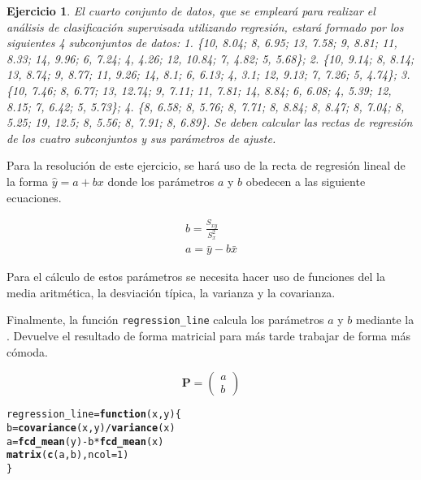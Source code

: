 \documentclass[12pt]{report}\usepackage[]{graphicx}\usepackage[dvipsnames]{xcolor}
\makeatletter
\newcommand{\hlnum}[1]{\textcolor[rgb]{0.686,0.059,0.569}{#1}}%
\newcommand{\hlopt}[1]{\textcolor[rgb]{0,0,0}{#1}}%
\newcommand{\hlstd}[1]{\textcolor[rgb]{0.345,0.345,0.345}{#1}}%
\newcommand{\hlkwa}[1]{\textcolor[rgb]{0.161,0.373,0.58}{\textbf{#1}}}%
\newcommand{\hlkwb}[1]{\textcolor[rgb]{0.69,0.353,0.396}{#1}}%
\newcommand{\hlkwc}[1]{\textcolor[rgb]{0.333,0.667,0.333}{#1}}%
\newcommand{\hlkwd}[1]{\textcolor[rgb]{0.737,0.353,0.396}{\textbf{#1}}}%
\newenvironment{kframe}{%
 \def\at@end@of@kframe{}%
 \ifinner\ifhmode%
  \def\at@end@of@kframe{\end{minipage}}%
  \begin{minipage}{\columnwidth}%
 \fi\fi%
 \def\FrameCommand##1{\hskip\@totalleftmargin \hskip-\fboxsep
 \colorbox{shadecolor}{##1}\hskip-\fboxsep
     \hskip-\linewidth \hskip-\@totalleftmargin \hskip\columnwidth}%
 \MakeFramed {\advance\hsize-\width
   \@totalleftmargin\z@ \linewidth\hsize
   \@setminipage}}%
 {\par\unskip\endMakeFramed%
 \at@end@of@kframe}
\newenvironment{knitrout}{}{} %
\newtheorem{exercise}{Ejercicio}[section]
\makeatother
\begin{document}
 				\begin{exercise}
 					El cuarto conjunto de datos, que se empleará para realizar el análisis de clasificación supervisada utilizando regresión, estará formado por los siguientes 4 subconjuntos de datos: 1. \{10, 8.04; 8, 6.95; 13, 7.58; 9, 8.81; 11, 8.33; 14, 9.96; 6, 7.24; 4, 4.26; 12, 10.84; 7, 4.82; 5, 5.68\}; 2. \{10, 9.14; 8, 8.14; 13, 8.74; 9, 8.77; 11, 9.26; 14, 8.1; 6, 6.13; 4, 3.1; 12, 9.13; 7, 7.26; 5, 4.74\}; 3. \{10, 7.46; 8, 6.77; 13, 12.74; 9, 7.11; 11, 7.81; 14, 8.84; 6, 6.08; 4, 5.39; 12, 8.15; 7, 6.42; 5, 5.73\}; 4. \{8, 6.58; 8, 5.76; 8, 7.71; 8, 8.84; 8, 8.47; 8, 7.04; 8, 5.25; 19, 12.5; 8, 5.56; 8, 7.91; 8, 6.89\}. Se deben calcular las rectas de regresión de los cuatro subconjuntos y sus parámetros de ajuste.
 				\end{exercise}
 				
 				Para la resolución de este ejercicio, se hará uso de la recta de regresión lineal de la forma $\hat{y} = a + bx$ donde los parámetros $a$ y $b$ obedecen a las siguiente ecuaciones. 
 				
 				\begin{equation}\label{ec:reg_param}
 					\begin{gathered}
 						b = \frac{S_{xy}}{S^2_x}\\
 						a = \bar{y} - b \bar{x}
 					\end{gathered}
 				\end{equation}
 				
 				Para el cálculo de estos parámetros se necesita hacer uso de funciones del  la media aritmética, la desviación típica, la varianza y la covarianza. 
 				
 				Finalmente, la función \texttt{regression\_line} calcula los parámetros $a$ y $b$ mediante la . Devuelve el resultado de forma matricial para más tarde trabajar de forma más cómoda. 
 				
 				$$
 				\textbf{P} = \begin{pmatrix}
 					a\\
 					b
 				\end{pmatrix}
 				$$
 				
\begin{knitrout}
\color{fgcolor}\begin{kframe}
\begin{alltt}
\hlstd{regression_line} \hlkwb{=} \hlkwa{function}\hlstd{(}\hlkwc{x}\hlstd{,} \hlkwc{y}\hlstd{) \{}
        \hlstd{b} \hlkwb{=} \hlkwd{covariance}\hlstd{(x, y)} \hlopt{/} \hlkwd{variance}\hlstd{(x)}
        \hlstd{a} \hlkwb{=} \hlkwd{fcd_mean}\hlstd{(y)} \hlopt{-} \hlstd{b} \hlopt{*} \hlkwd{fcd_mean}\hlstd{(x)}
        \hlkwd{matrix}\hlstd{(}\hlkwd{c}\hlstd{(a, b),} \hlkwc{ncol} \hlstd{=} \hlnum{1}\hlstd{)}
\hlstd{\}}
\end{alltt}
\end{kframe}
\end{knitrout}
 				
\end{document}
